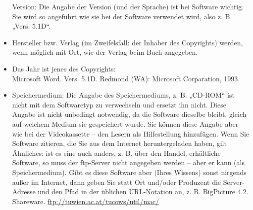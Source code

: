 \documentclass[]{book}
\theoremstyle{definition}
\theoremstyle{definition}
\theoremstyle{definition}
\theoremstyle{remark}
\begin{document}
\begin{itemize}
  Version: Die Angabe der Version (und der Sprache) ist bei Software
  wichtig. Sie wird so angeführt wie sie bei der Software verwendet
  wird, also z. B. „Vers. 5.1D``.
\item
  Hersteller bzw. Verlag (im Zweifelsfall: der Inhaber des Copyrights)
  werden, wenn möglich mit Ort, wie der Verlag beim Buch angegeben.
\item
  Das Jahr ist jenes des Copyrights:\\
  Microsoft Word. Vers. 5.1D. Redmond (WA): Microsoft Corparation, 1993.
\item
  Speichermedium: Die Angabe des Speichermediums, z. B. „CD-ROM`` ist
  nicht mit dem Softwaretyp zu verwechseln und ersetzt ihn nicht. Diese
  Angabe ist nicht unbedingt notwendig, da die Software dieselbe bleibt,
  gleich auf welchem Medium sie gespeichert wurde. Sie können diese
  Angabe aber -- wie bei der Videokassette -- den Lesern als
  Hilfestellung hinzufügen. Wenn Sie Software zitieren, die Sie aus dem
  Internet heruntergeladen haben, gilt Ähnliches: ist es eine auch
  anders, z. B. über den Handel, erhältliche Software, so muss der
  ftp-Server nicht angegeben werden -- aber er kann (als
  Speichermedium). Gibt es diese Software aber (Ihres Wissens) sonst
  nirgends außer im Internet, dann geben Sie statt Ort und/oder
  Produzent die Server-Adresse und den Pfad in der üblichen URL-Notation
  an, z. B. BigPicture 4.2. Shareware.
  \url{ftp://tuwien.ac.at/tucows/util/mac/}
\end{itemize}
\end{document}

